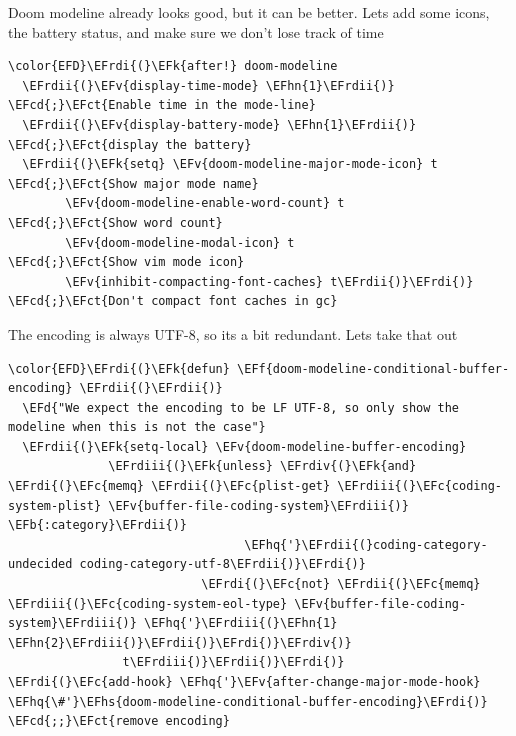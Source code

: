 \documentclass{scrartcl}
\newcommand{\EFk}[1]{\textcolor{EFk}{#1}} %
\newcommand{\EFd}[1]{\textcolor{EFd}{\textit{#1}}} %
\newcommand{\EFb}[1]{\textcolor{EFb}{#1}} %
\newcommand{\EFct}[1]{\textcolor{EFct}{#1}} %
\newcommand{\EFc}[1]{\textcolor{EFc}{#1}} %
\newcommand{\EFv}[1]{\textcolor{EFv}{#1}} %
\newcommand{\EFf}[1]{\textcolor{EFf}{#1}} %
\newcommand{\EFcd}[1]{\textcolor{EFcd}{#1}} %
\newcommand{\EFhn}[1]{\textcolor{EFhn}{\textbf{#1}}} %
\newcommand{\EFhq}[1]{\textcolor{EFhq}{#1}} %
\newcommand{\EFhs}[1]{\textcolor{EFhs}{#1}} %
\newcommand{\EFrdi}[1]{\textcolor{EFrdi}{#1}} %
\newcommand{\EFrdii}[1]{\textcolor{EFrdii}{#1}} %
\newcommand{\EFrdiii}[1]{\textcolor{EFrdiii}{#1}} %
\newcommand{\EFrdiv}[1]{\textcolor{EFrdiv}{#1}} %
\begin{document}
Doom modeline already looks good, but it can be better. Lets add some icons, the battery status, and make sure we don't lose track of time
\begin{Code}
\begin{Verbatim}[]
\color{EFD}\EFrdi{(}\EFk{after!} doom-modeline
  \EFrdii{(}\EFv{display-time-mode} \EFhn{1}\EFrdii{)}                              \EFcd{;}\EFct{Enable time in the mode-line}
  \EFrdii{(}\EFv{display-battery-mode} \EFhn{1}\EFrdii{)}                           \EFcd{;}\EFct{display the battery}
  \EFrdii{(}\EFk{setq} \EFv{doom-modeline-major-mode-icon} t              \EFcd{;}\EFct{Show major mode name}
        \EFv{doom-modeline-enable-word-count} t            \EFcd{;}\EFct{Show word count}
        \EFv{doom-modeline-modal-icon} t                   \EFcd{;}\EFct{Show vim mode icon}
        \EFv{inhibit-compacting-font-caches} t\EFrdii{)}\EFrdi{)}           \EFcd{;}\EFct{Don't compact font caches in gc}
\end{Verbatim}
\end{Code}

The encoding is always UTF-8, so its a bit redundant. Lets take that out
\begin{Code}
\begin{Verbatim}[]
\color{EFD}\EFrdi{(}\EFk{defun} \EFf{doom-modeline-conditional-buffer-encoding} \EFrdii{(}\EFrdii{)}
  \EFd{"We expect the encoding to be LF UTF-8, so only show the modeline when this is not the case"}
  \EFrdii{(}\EFk{setq-local} \EFv{doom-modeline-buffer-encoding}
              \EFrdiii{(}\EFk{unless} \EFrdiv{(}\EFk{and} \EFrdi{(}\EFc{memq} \EFrdii{(}\EFc{plist-get} \EFrdiii{(}\EFc{coding-system-plist} \EFv{buffer-file-coding-system}\EFrdiii{)} \EFb{:category}\EFrdii{)}
                                 \EFhq{'}\EFrdii{(}coding-category-undecided coding-category-utf-8\EFrdii{)}\EFrdi{)}
                           \EFrdi{(}\EFc{not} \EFrdii{(}\EFc{memq} \EFrdiii{(}\EFc{coding-system-eol-type} \EFv{buffer-file-coding-system}\EFrdiii{)} \EFhq{'}\EFrdiii{(}\EFhn{1} \EFhn{2}\EFrdiii{)}\EFrdii{)}\EFrdi{)}\EFrdiv{)}
                t\EFrdiii{)}\EFrdii{)}\EFrdi{)}
\EFrdi{(}\EFc{add-hook} \EFhq{'}\EFv{after-change-major-mode-hook} \EFhq{\#'}\EFhs{doom-modeline-conditional-buffer-encoding}\EFrdi{)} \EFcd{;;}\EFct{remove encoding}
\end{Verbatim}
\end{Code}
\end{document}
